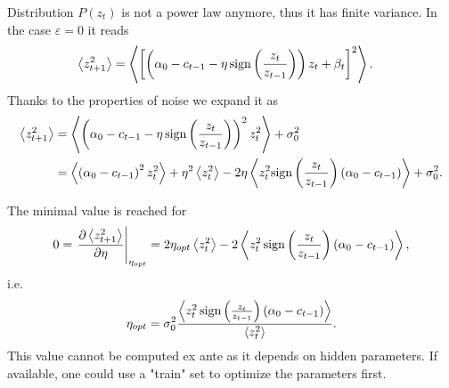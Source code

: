 \documentclass[FinalReport.tex]{subfiles}
\begin{document}
Distribution $P(z_t)$ is not a power law anymore, thus it has finite variance. In the case $\varepsilon=0$ it reads
\begin{align}
	\expval{z_{t+1}^2}&=\expval{\left[\left(\alpha_0-c_{t-1}-\eta\,\text{sign}\left(\frac{z_t}{z_{t-1}}\right)\right)z_t +\beta_t\right]^2}.
\end{align}
Thanks to the properties of noise we expand it as
\begin{align}
	\expval{z_{t+1}^2}&=\expval{\left(\alpha_0-c_{t-1}-\eta\,\text{sign}\left(\frac{z_t}{z_{t-1}}\right)\right)^2z_t^2}+\sigma_0^2\\
	&=\expval{\left(\alpha_0-c_{t-1}\right)^2z_t^2}+\eta^2\expval{z_t^2}-2\eta\expval{z_t^2\text{sign}\left(\frac{z_t}{z_{t-1}}\right)(\alpha_0-c_{t-1})}+\sigma_0^2.
\end{align}

The minimal value is reached for 
\begin{equation}
	0=\left.\pdv{\expval{z_{t+1}^2}}{\eta}\right\vert_{\eta_{opt}}=2\eta_{opt}\expval{z_t^2}-2\expval{z_t^2\,\text{sign}\left(\frac{z_t}{z_{t-1}}\right)(\alpha_0-c_{t-1})},
\end{equation}
i.e.
\begin{equation}
	\eta_{opt}=	\sigma_0^2\frac{\expval{z_t^2\,\text{sign}\left(\frac{z_t}{z_{t-1}}\right)(\alpha_0-c_{t-1})}}{\expval{z_t^2}}.
\end{equation}
This value cannot be computed ex ante as it depends on hidden parameters. If available, one could use a "train" set to optimize the parameters first.
\end{document}
